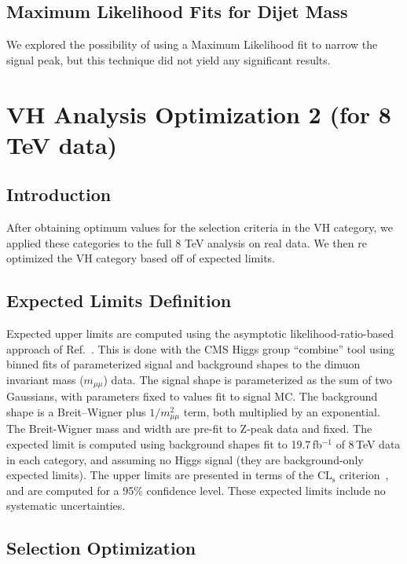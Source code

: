 \documentclass[12pt]{article}
\begin{document}
\subsection{Maximum Likelihood Fits for Dijet Mass}

We explored the possibility of using a Maximum Likelihood fit to narrow the signal peak, but this technique did not yield any significant results.

\section{VH Analysis Optimization 2 (for 8 TeV data)}

\subsection{Introduction}

After obtaining optimum values for the selection criteria in the VH category, we applied these categories to the full 8 TeV analysis on real data. 
We then re optimized the VH category based off of expected limits. 

\subsection{Expected Limits Definition}

Expected upper limits are computed using the asymptotic likelihood-ratio-based approach of 
Ref.~\cite{stats}.  This is done with the CMS Higgs group ``combine'' tool using binned
fits of parameterized signal and background shapes to the dimuon invariant mass 
($m_{\mu\mu}$) data.  The signal shape is parameterized
as the sum of two Gaussians, with parameters fixed to values fit to signal MC.
The background shape is a Breit--Wigner plus $1/m_{\mu\mu}^2$ term, both multiplied
by an exponential.  The Breit-Wigner mass and width are pre-fit to Z-peak data and fixed.
The expected limit is computed
using background shapes fit to 19.7\,fb$^{-1}$ of 8\,TeV data in each category,
and assuming no Higgs signal (they are background-only expected limits).  The upper
limits are presented in terms of the $\mathrm{CL_s}$ criterion~\cite{cls}, and are computed for 
a 95\% confidence level.  These expected limits include no systematic uncertainties.

\subsection{Selection Optimization}
\end{document}
